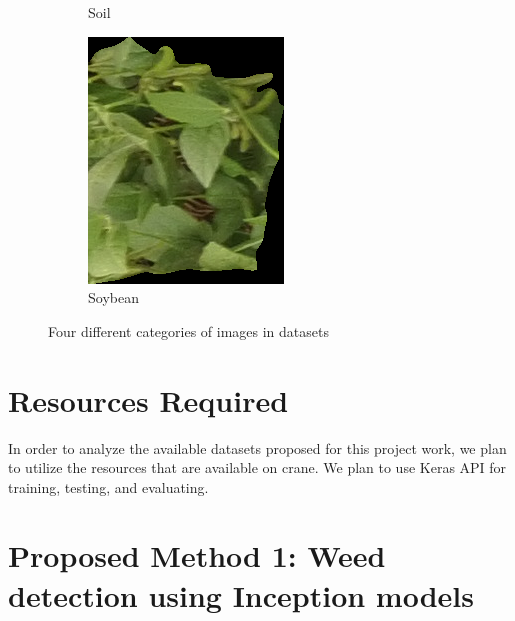 \documentclass{report}
\begin{document}
\begin{figure}[H]
\begin{subfigure}[b]{0.3\textwidth}
         \caption{Soil}
         \label{fig:3}
     \end{subfigure}
     \begin{subfigure}[b]{0.3\textwidth}
         \includegraphics[width=\textwidth]{Soyabean.png}
         \caption{Soybean}
         \label{fig:4}
     \end{subfigure}
     \caption{Four different categories of images in datasets}
    \label{fig:lebeled_img}
\end{figure}
\section{Resources Required}
In order to analyze the available datasets proposed for this project work, we plan to utilize the resources that are available on crane. We plan to use Keras API for training, testing, and evaluating. 

\section{Proposed Method 1: Weed detection using Inception models}
\end{document}
